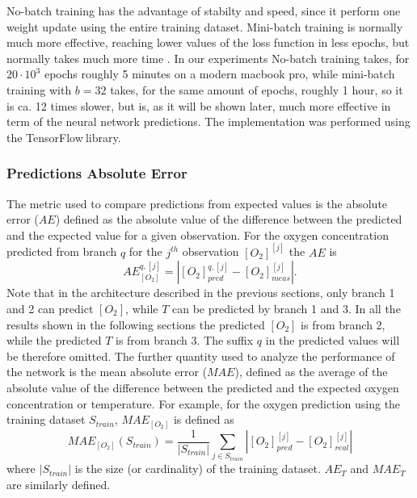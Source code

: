 \documentclass[9pt,twocolumn,twoside,pdftex]{optica}
\begin{document}
No-batch training has the advantage of stabilty and speed, since it perform one weight update using the entire training dataset. Mini-batch training is normally much more effective, reaching lower values of the loss function in less epochs, but normally takes much more time \cite{Michelucci2017}. In our experiments No-batch training takes, for $20 \cdot 10^3$ epochs roughly 5 minutes on a modern macbook pro, while mini-batch training with $b=32$ takes, for the same amount of epochs, roughly 1 hour, so it is ca. 12 times slower, but is, as it will be shown later, much more effective in term of the neural network predictions. 
The implementation was performed using the TensorFlow\texttrademark $\ $library. 

\subsubsection{Predictions Absolute Error}

The metric used to compare predictions from expected values is the absolute error ($AE$) defined as the absolute value of the difference between the predicted and the expected value for a given observation. For the oxygen concentration predicted from branch $q$ for the 
$j^{th}$ observation $[O_2]^{[j]}$  the $AE$ is 
\begin{equation}
\label{AE}
AE^{q,{[j]}}_{[O_2]} = |[O_2]^{q,{[j]}}_{pred}-[O_2]^{[j]}_{meas}|.
\end{equation}
Note that in the architecture described in the previous sections, only branch 1 and 2 can predict $[O_2]$, while $T$ can be predicted by branch 1 and 3. In all the results shown in the following sections the predicted $[O_2]$ is from branch 2, while the predicted $T$ is from branch 3. The suffix $q$ in the predicted values will be therefore omitted.
The further quantity used to analyze the performance of the network is the mean absolute error ($MAE$), defined as the average of the absolute value of the difference between the predicted and the expected oxygen concentration or temperature. For example, for the oxygen prediction using the training dataset $S_{train}$, $MAE_{[O_2]}$ is defined as 
\begin{equation}
\label{MAE}
MAE_{[O_2]}(S_{train}) = \frac{1}{|S_{train}|} \sum_{j \in S_{train}}|[O_2]_{pred}^{[j]}-[O_2]_{real}^{[j]}|
\end{equation}
where $|S_{train}|$ is the size (or cardinality) of the training dataset. 
$AE_{T}$ and $MAE_T$ are similarly defined.
\end{document}
